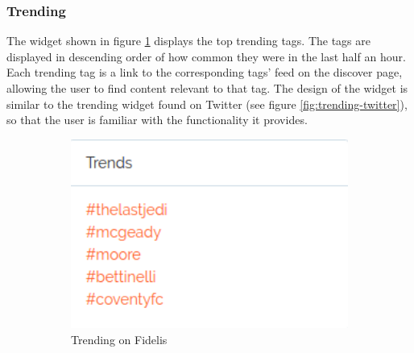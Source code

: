 \subsubsection{Trending} \label{sec:design-trending}
The widget shown in figure \ref{fig:trending} displays the top trending tags. The tags are displayed in descending order of how common they were in the last half an hour. Each trending tag is a link to the corresponding tags' feed on the discover page, allowing the user to find content relevant to that tag. The design of the widget is similar to the trending widget found on Twitter (see figure \ref{fig:trending-twitter}), so that the user is familiar with the functionality it provides.

\begin{figure}[H]
	\centering
	\begin{subfigure}[b]{0.4\linewidth}
		\includegraphics[width=1\textwidth]{Images/Design/trending-widget}
		\caption{Trending on Fidelis}
		\label{fig:trending}
	\end{subfigure}
	\begin{subfigure}[b]{0.4\linewidth}

\end{subfigure}
\end{figure}
